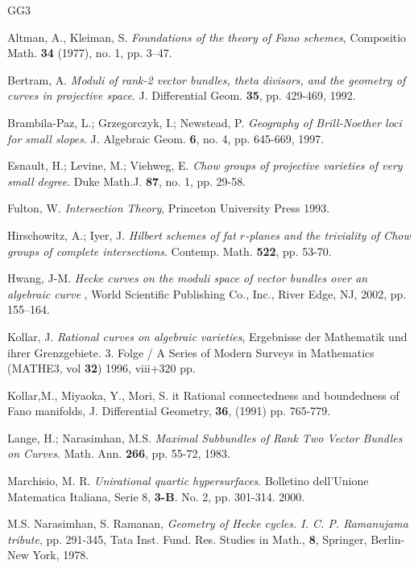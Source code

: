 \documentclass[12pt, reqno]{amsart}
\begin{document}
\begin{thebibliography}{GG3} 

Altman, A., Kleiman, S. {\it  Foundations of the theory of Fano schemes},
Compositio Math. {\bf 34} (1977), no. 1, pp. 3--47.

 Bertram, A. {\it Moduli of rank-2 vector bundles, theta divisors, and the geometry of curves in projective space}. J. Differential Geom. {\bf 35}, pp. 429-469, 1992.
 
 Brambila-Paz, L.; Grzegorczyk, I.; Newstead, P. {\it Geography of Brill-Noether loci for small slopes}. J. Algebraic Geom. {\bf 6}, no. 4, pp. 645-669, 1997.

 Esnault, H.; Levine, M.; Viehweg, E. {\it Chow groups of projective varieties of very small degree}. Duke Math.J. {\bf 87}, no. 1, pp. 29-58.

 Fulton, W. {\it Intersection Theory}, Princeton University Press 1993.

 Hirschowitz, A.; Iyer, J. {\it Hilbert schemes of fat $r$-planes and the triviality of Chow groups of complete intersections}. Contemp. Math. {\bf 522}, pp. 53-70.


 Hwang, J-M. {\it  Hecke curves on the moduli space of vector bundles over an algebraic curve },
World Scientific Publishing Co., Inc., River Edge, NJ, 2002, pp. 155–164.




 Kollar, J. {\it Rational curves on algebraic varieties},  Ergebnisse der Mathematik und ihrer Grenzgebiete. 3. Folge / A Series of Modern Surveys in Mathematics (MATHE3, vol {\bf 32})
1996, viii+320 pp.


 Kollar,M., Miyaoka, Y., Mori, S. {it Rational connectedness and boundedness of Fano manifolds}, J. Differential Geometry, \textbf{36}, (1991) pp. 765-779. 

 Lange, H.; Narasimhan, M.S. {\it Maximal Subbundles of Rank Two Vector Bundles on Curves}. Math. Ann. {\bf 266}, pp. 55-72, 1983.

 Marchisio, M. R. {\it Unirational quartic hypersurfaces}. Bolletino dell'Unione Matematica Italiana, Serie 8, {\bf 3-B}. No. 2, pp. 301-314. 2000.


 M.S. Narasimhan, S. Ramanan, { \it Geometry of Hecke cycles. I. 
C. P. Ramanujama tribute}, pp. 291-345, Tata Inst. Fund. Res. Studies in Math., \textbf{8}, Springer, Berlin-New York, 1978.



\end{thebibliography}
\end{document}

